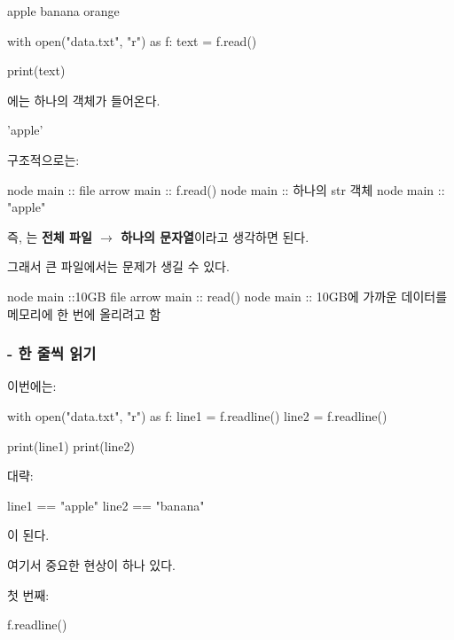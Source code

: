 \begin{dhkcode}
apple
banana
orange
\end{dhkcode}

\begin{dhkcode}
with open("data.txt", "r") as f:
    text = f.read()

print(text)
\end{dhkcode}

에는 하나의 객체가 들어온다.

\begin{dhkzsh}
'apple\nbanana\norange'
\end{dhkzsh}

구조적으로는:

\begin{dhkbranch}
node main :: file
arrow main :: f.read()
node main :: 하나의 str 객체
node main :: "apple\nbanana\norange"
\end{dhkbranch}

즉, 는 \textbf{전체 파일 $\rightarrow$ 하나의 문자열}이라고 생각하면 된다.

그래서 큰 파일에서는 문제가 생길 수 있다.

\begin{dhkbranch}
node main ::10GB file
arrow main :: read()
node main :: 10GB에 가까운 데이터를 메모리에 한 번에 올리려고 함
\end{dhkbranch}

\subsubsection{ - 한 줄씩 읽기}

이번에는:

\begin{dhkcode}
with open("data.txt", "r") as f:
    line1 = f.readline()
    line2 = f.readline()

print(line1)
print(line2)
\end{dhkcode}

대략:

\begin{dhkzsh}
line1 == "apple\n"
line2 == "banana\n"
\end{dhkzsh}

이 된다.

여기서 중요한 현상이 하나 있다.

첫 번째:

\begin{dhkcode}
f.readline()
\end{dhkcode}

